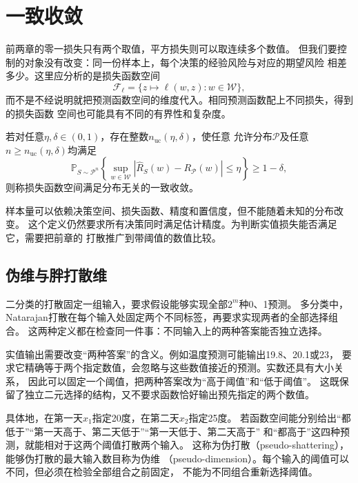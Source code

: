 \section{一致收敛}
\label{sec:real-valued-classes}

前两章的零一损失只有两个取值，平方损失则可以取连续多个数值。
但我们要控制的对象没有改变：同一份样本上，每个决策的经验风险与对应的期望风险
相差多少。这里应分析的是损失函数空间
\[
 \mathcal F_\ell=\{z\mapsto\ell(w,z):w\in\mathcal W\},
\]
而不是不经说明就把预测函数空间的维度代入。相同预测函数配上不同损失，得到的损失函数
空间也可能具有不同的有界性和复杂度。

\begin{definition}[一般学习问题的一致收敛]
\label{def:general-uniform-convergence}
若对任意$\eta,\delta\in(0,1)$，存在整数$n_{\mathrm{uc}}(\eta,\delta)$，使任意
允许分布$\mathcal P$及任意$n\geq n_{\mathrm{uc}}(\eta,\delta)$均满足
\[
 \mathbb P_{S\sim\mathcal P^n}\!\left\{
 \sup_{w\in\mathcal W}|\hat R_S(w)-R_{\mathcal P}(w)|\leq\eta
 \right\}\geq1-\delta,
\]
则称损失函数空间满足分布无关的一致收敛。
\end{definition}

样本量可以依赖决策空间、损失函数、精度和置信度，但不能随着未知的分布改变。
这个定义仍然要求所有决策同时满足估计精度。为判断实值损失能否满足它，需要把前章的
打散推广到带阈值的数值比较。

\subsection{伪维与胖打散维}

二分类的打散固定一组输入，要求假设能够实现全部$2^m$种0、1预测。
多分类中，Natarajan打散在每个输入处固定两个不同标签，再要求实现两者的全部选择组合。
这两种定义都在检查同一件事：不同输入上的两种答案能否独立选择。

实值输出需要改变“两种答案”的含义。例如温度预测可能输出19.8、20.1或23，
要求它精确等于两个指定数值，会忽略与这些数值接近的预测。实数还具有大小关系，
因此可以固定一个阈值，把两种答案改为“高于阈值”和“低于阈值”。
这既保留了独立二元选择的结构，又不要求函数恰好输出预先指定的两个数值。

具体地，在第一天$x_1$指定20度，在第二天$x_2$指定25度。
若函数空间能分别给出“都低于”“第一天高于、第二天低于”“第一天低于、第二天高于”
和“都高于”这四种预测，就能相对于这两个阈值打散两个输入。
这称为伪打散（pseudo-shattering），能够伪打散的最大输入数目称为伪维
（pseudo-dimension）。每个输入的阈值可以不同，但必须在检验全部组合之前固定，
不能为不同组合重新选择阈值。

